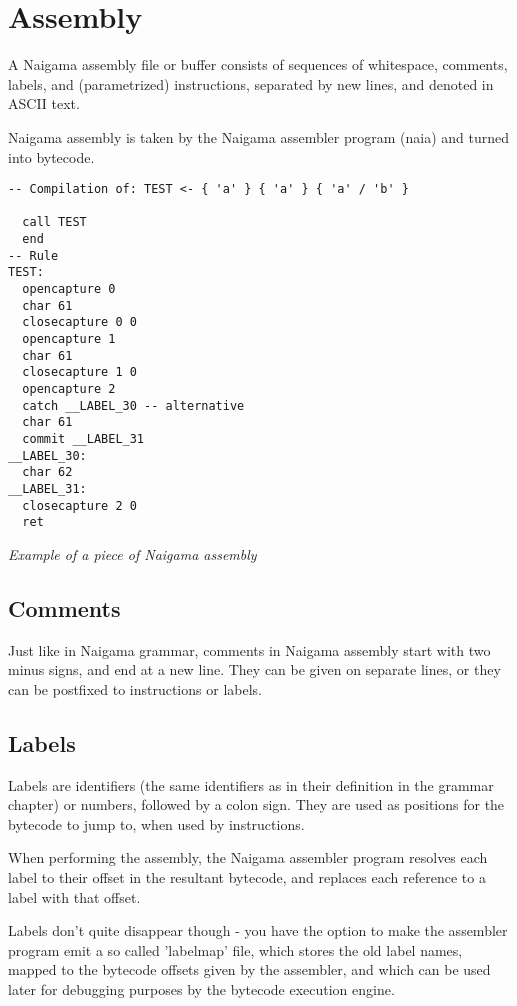 \section{Assembly}
\label{sec:assembly}

A Naigama assembly file or buffer consists of sequences of
whitespace, comments, labels, and (parametrized) instructions, separated
by new lines, and denoted in ASCII text.

Naigama assembly is taken by the Naigama assembler program (naia) and turned
into bytecode.

\begin{myquote}
\begin{verbatim}
-- Compilation of: TEST <- { 'a' } { 'a' } { 'a' / 'b' }

  call TEST
  end
-- Rule
TEST:
  opencapture 0
  char 61
  closecapture 0 0
  opencapture 1
  char 61
  closecapture 1 0
  opencapture 2
  catch __LABEL_30 -- alternative
  char 61
  commit __LABEL_31
__LABEL_30:
  char 62
__LABEL_31:
  closecapture 2 0
  ret

\end{verbatim}
\end{myquote}
\textit{Example of a piece of Naigama assembly}

\subsection{Comments}

Just like in Naigama grammar,
comments in Naigama assembly start with two minus signs, and end at
a new line. They can be given on separate lines, or they can be
postfixed to instructions or labels.

\subsection{Labels}

Labels are identifiers (the same identifiers as in their definition
in the grammar chapter) or numbers, followed by a colon sign. They are used
as positions for the bytecode to jump to, when used by instructions.

When performing the assembly, the Naigama assembler program resolves
each label to their offset in the resultant bytecode, and replaces each
reference to a label with that offset.

Labels don't quite disappear though - you have the option to make the
assembler program emit a so called 'labelmap' file, which stores the old
label names, mapped to the bytecode offsets given by the assembler,
and which can be used later
for debugging purposes by the bytecode execution engine.

